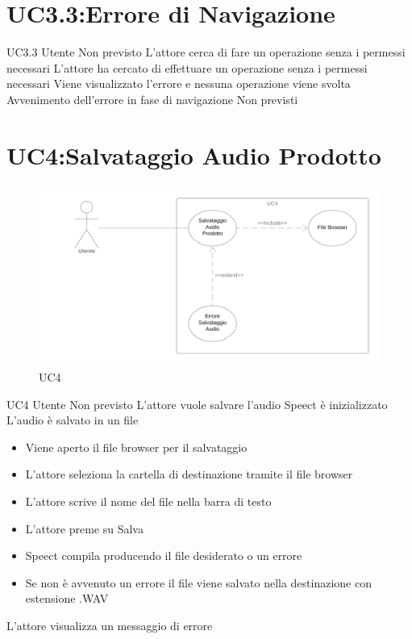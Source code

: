 \documentclass[../AnalisideiRequisiti.tex]{subfiles}
\begin{document}
\section{UC3.3:Errore di Navigazione}
\UserCase
{UC3.3}
{Utente}
{Non previsto}
{L'attore cerca di fare un operazione senza i permessi necessari}
{L'attore ha cercato di effettuare un operazione senza i permessi necessari}
{Viene visualizzato l'errore e nessuna operazione viene svolta}
{Avvenimento dell'errore in fase di navigazione}
{Non previsti}

\section{UC4:Salvataggio Audio Prodotto}
\begin{figure}[H]
	\caption{UC4}
	\centering
	\includegraphics[width=\textwidth]{../img/UC04.png}
\end{figure}
\UserCase
{UC4}
{Utente}
{Non previsto}
{L'attore vuole salvare l'audio}
{Speect è inizializzato }
{L'audio è salvato in un file}
{
		\begin{itemize}
		\item{} Viene aperto il file browser per il salvataggio
		\item{} L'attore seleziona la cartella di destinazione tramite il file browser 
		\item{} L'attore scrive il nome del file nella barra di testo
		\item{} L'attore preme su Salva 
		\item{} Speect compila producendo il file desiderato o un errore  
		\item{} Se non è avvenuto un errore il file viene salvato nella destinazione con estensione .WAV
		\end{itemize}
}
{L'attore visualizza un messaggio di errore }		
\end{document}
